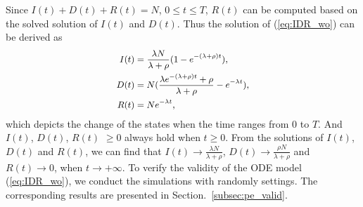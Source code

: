 Since $I(t)+D(t)+R(t)=N$, $0 \le t \le T$,
$R(t)$ can be computed based on the solved solution of $I(t)$ and $D(t)$.
Thus the solution of (\ref{eq:IDR_wo}) can be derived as
\begin{equation}
\begin{small}
\label{eq:IDR_wo_solu}
\begin{aligned}
I(t) &= \frac{ \lambda N }{ \lambda + \rho }
(1- e^{-(\lambda + \rho)t}), \\
D(t) &= N (\frac{\lambda e^{-(\lambda + \rho)t} + \rho}
{ \lambda + \rho } - e^{- \lambda t}), \\
R(t) &= N e^{- \lambda t},
\end{aligned}
\end{small}
\end{equation}
which depicts the change of the states
when the time ranges from $0$ to $T$.
And $I(t)$, $D(t)$, $R(t)$ $\ge 0$ always hold
when $t \ge 0$.
From the solutions of $I(t)$, $D(t)$ and $R(t)$,
we can find that $I(t) \rightarrow \frac{ \lambda N }
{ \lambda + \rho }$,
$D(t) \rightarrow \frac{ \rho N }{ \lambda + \rho }$
and $R(t) \rightarrow 0$,
when $t \rightarrow + \infty$.
To verify the validity of the ODE model (\ref{eq:IDR_wo}),
we conduct the simulations with randomly settings.
The corresponding results are presented in
Section.~\ref{subsec:pe_valid}.

